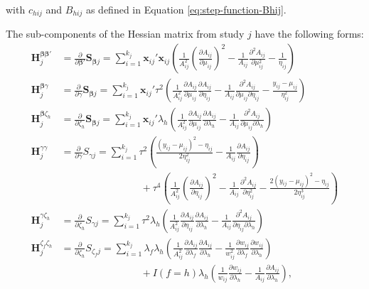 \documentclass[
  man, donotrepeattitle,floatsintext]{apa7}
\begin{document}
with \(c_{hij}\) and \(B_{hij}\) as defined in Equation \eqref{eq:step-function-Bhij}.

The sub-components of the Hessian matrix from study \(j\) have the following forms:
\begin{align}
\mathbf{H}_{j}^{\boldsymbol\beta \boldsymbol\beta'} &= \frac{\partial}{\partial \boldsymbol\beta'} \mathbf{S}_{\boldsymbol\beta j} = \sum_{i=1}^{k_j} \mathbf{x}_{ij}' \mathbf{x}_{ij} \left(\frac{1}{A_{ij}^2}\left(\frac{\partial A_{ij}}{\partial \mu_{ij}}\right)^2 - \frac{1}{A_{ij}} \frac{\partial^2 A_{ij}}{\partial \mu_{ij}^2} - \frac{1}{\eta_{ij}} \right) \\
\mathbf{H}_{j}^{\boldsymbol\beta \gamma} &= \frac{\partial}{\partial \gamma} \mathbf{S}_{\boldsymbol\beta j} = \sum_{i=1}^{k_j} \mathbf{x}_{ij}' \tau^2 \left(\frac{1}{A_{ij}^2} \frac{\partial A_{ij}}{\partial \mu_{ij}}\frac{\partial A_{ij}}{\partial \eta_{ij}} - \frac{1}{A_{ij}}\frac{\partial^2 A_{ij}}{\partial \mu_{ij} \partial \eta_{ij}} - \frac{y_{ij} - \mu_{ij}}{\eta_{ij}^2} \right) \\
\label{eq:H-beta-zeta} \mathbf{H}_{j}^{\boldsymbol\beta \zeta_h} &= \frac{\partial}{\partial \zeta_h} \mathbf{S}_{\boldsymbol\beta j} = \sum_{i=1}^{k_j} \mathbf{x}_{ij}' \lambda_h \left(\frac{1}{A_{ij}^2} \frac{\partial A_{ij}}{\partial \mu_{ij}}\frac{\partial A_{ij}}{\partial \lambda_h} - \frac{1}{A_{ij}}\frac{\partial^2 A_{ij}}{\partial \mu_{ij} \partial \lambda_h} \right) \\
\mathbf{H}_{j}^{\gamma \gamma} &= \frac{\partial}{\partial \gamma} S_{\gamma j} = \sum_{i=1}^{k_j} \tau^2 \left(\frac{\left(y_{ij} - \mu_{ij}\right)^2 - \eta_{ij}}{2\eta_{ij}^2} - \frac{1}{A_{ij}}\frac{\partial A_{ij}}{\partial \eta_{ij}}\right) \nonumber \\
& \qquad \qquad \qquad \qquad  + \tau^4 \left(\frac{1}{A_{ij}^2} \left(\frac{\partial A_{ij}}{\partial \eta_{ij}}\right)^2 - \frac{1}{A_{ij}}\frac{\partial^2 A_{ij}}{\partial \eta_{ij}^2}  - \frac{2(y_{ij} - \mu_{ij})^2 - \eta_{ij}}{2\eta_{ij}^3}\right) \\
\label{eq:H-gamma-zeta} \mathbf{H}_{j}^{\gamma \zeta_h} &= \frac{\partial}{\partial \zeta_h} S_{\gamma j} = \sum_{i=1}^{k_j} \tau^2 \lambda_h \left(\frac{1}{A_{ij}^2} \frac{\partial A_{ij}}{\partial \eta_{ij}}\frac{\partial A_{ij}}{\partial \lambda_h} - \frac{1}{A_{ij}}\frac{\partial^2 A_{ij}}{\partial \eta_{ij} \partial \lambda_h} \right) \\
\mathbf{H}_{j}^{\zeta_f \zeta_h} &= \frac{\partial}{\partial \zeta_h} S_{\zeta_f j} = \sum_{i=1}^{k_j} \lambda_f \lambda_h \left(\frac{1}{A_{ij}^2} \frac{\partial A_{ij}}{\partial \lambda_f}\frac{\partial A_{ij}}{\partial \lambda_h} - \frac{1}{w_{ij}^2}\frac{\partial w_{ij}}{\partial \lambda_f}\frac{\partial w_{ij}}{\partial \lambda_h} \right) \nonumber \\
& \qquad \qquad \qquad \qquad  + I(f = h) \lambda_h\left(\frac{1}{w_{ij}}\frac{\partial w_{ij}}{\partial \lambda_h} - \frac{1}{A_{ij}}\frac{\partial A_{ij}}{\partial \lambda_h}\right), \label{eq:H-zeta-zeta}
\end{align}
\end{document}
